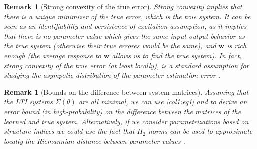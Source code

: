 \documentclass{article}
\newtheorem{remark}[theorem]{Remark}
\newcommand{\w}{\mathbf{w}}
\begin{document}
\begin{remark}[Strong convexity of the true error]
  \label{app:strong convexity}
 Strong convexity implies that there is a unique minimizer of the true error, which is
 the true system. It  can be seen as an \emph{identifiability and persistence of excitation assumption}, as it implies that there is no parameter value which gives the same
 input-output behavior as the true system (otherwise their true errores would be the same),
 and $\w$ is rich enough (the average response to $\w$ allows us to find the true system).
 In fact, strong convexity of the true error (at least locally), is a standard
 assumption  for studying the asympotic distribution of the parameter estimation error
 \cite[Theorem 9.1]{LjungBook}. 
\end{remark}
\begin{remark}[Bounds on the difference between  system matrices]
  \label{matrix:trans}
Assuming that the LTI systems $\Sigma(\theta)$ are all minimal,
we can use \eqref{col1:eq1}
and \cite[Theorem V.2]{oymak2021revisiting}
to derive
an error bound (in high-probability) 
on the difference between 
the matrices of the learned and true system.
Alternatively, if we consider parametrizations based on structure indices \cite[Chapter 3]{RalfPeeters} 
we could use the fact that $H_2$ norms can be used to approximate locally the Riemannian distance between parameter values  \cite[Chapter 4, page 129]{RalfPeeters}. 
\end{remark}
%
%
%
\end{document}
